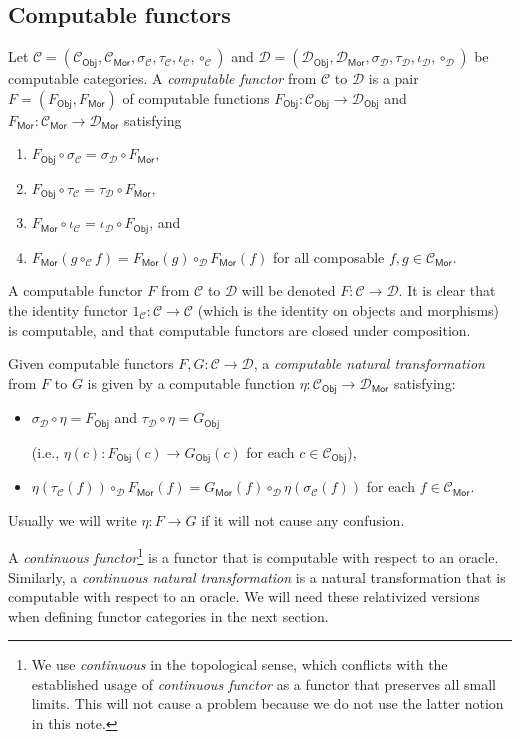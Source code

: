\documentclass[envcountsame]{llncs}
\def\calC{{\mathcal{C}}}
\def\calD{{\mathcal{D}}}
\newcommand{\Mor}{\mathsf{Mor}}
\newcommand{\Obj}{\mathsf{Obj}}
\def\src{{\sigma}}
\def\tar{{\tau}}
\def\id{{\iota}}
\begin{document}
\subsection{Computable functors}

Let $\calC= (\calC_\Obj, \calC_\Mor, \src_\calC,\tar_\calC,\id_\calC,\circ_\calC)$ and $\calD= (\calD_\Obj, \calD_\Mor, \src_\calD,\tar_\calD,\id_\calD,\circ_\calD)$ be computable categories. A \emph{computable functor} from $\calC$ to $\calD$ is a pair $F = (F_{\Obj}, F_{\Mor})$ of computable functions $F_{\Obj} \colon \calC_\Obj\to\calD_\Obj$ and $F_{\Mor} \colon \calC_\Mor\to\calD_\Mor$ satisfying
\begin{enumerate}
\item
$F_{\Obj}\circ \src_\calC = \src_\calD \circ F_{\Mor}$,
\item
$F_{\Obj}\circ \tar_\calC = \tar_\calD \circ F_{\Mor}$,
\item
$F_{\Mor}\circ \id_\calC = \id_\calD \circ F_{\Obj}$, and
\item
$F_{\Mor}(g\circ_\calC f) = F_{\Mor}(g) \circ_\calD F_{\Mor}(f)$ for all composable $f,g\in\calC_\Mor$.
\end{enumerate}
A computable functor $F$ from $\calC$ to $\calD$ will be denoted $F\colon \calC\to\calD$. It is clear that the identity functor $1_\calC\colon\calC\to\calC$ (which is the identity on objects and morphisms) is computable, and that computable functors are closed under composition.

Given computable functors $F,G\colon \calC\to\calD$, a \emph{computable natural transformation} from $F$ to $G$ is given by a computable function $\eta\colon \calC_\Obj \to \calD_\Mor$ satisfying:
\begin{itemize}
\item
$\src_{\calD}\circ\eta = F_{\Obj}$ and $\tar_{\calD}\circ \eta = G_{\Obj}$ 

(i.e., $\eta(c) \colon F_{\Obj}(c) \to G_{\Obj}(c)$ for each $c\in\calC_\Obj$), 
\item
 $\eta(\tar_\calC(f)) \circ_\calD F_{\Mor}(f) = G_{\Mor}(f) \circ_\calD \eta(\src_\calC(f))$ for each $f\in\calC_\Mor$.
\end{itemize}
Usually we will write $\eta\colon F\to G$ if it will not cause any confusion.

A \emph{continuous functor}\footnote{We use \emph{continuous} in the topological sense, which conflicts with the established usage of \emph{continuous functor} as a functor that preserves all small limits. This will not cause a problem because we do not use the latter notion in this note.} is a functor that is computable with respect to an oracle. Similarly, a \emph{continuous natural transformation} is a natural transformation that is computable with respect to an oracle. We will need these relativized versions  when defining functor categories in the next section. 
\end{document}
